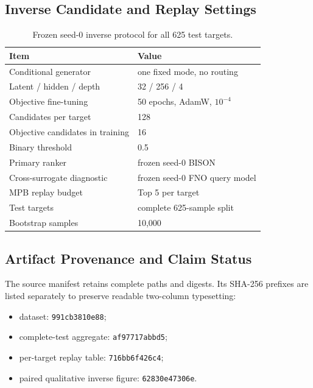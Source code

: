 \subsection{Inverse Candidate and Replay Settings}

\begin{table}[H]
  \caption{Frozen seed-0 inverse protocol for all 625 test targets.}
  \label{tab:inverse-config}
  \centering
  \small
  \begin{tabular}{ll}
    \toprule
    Item & Value \\
    \midrule
    Conditional generator & one fixed mode, no routing \\
    Latent / hidden / depth & 32 / 256 / 4 \\
    Objective fine-tuning & 50 epochs, AdamW, $10^{-4}$ \\
    Candidates per target & 128 \\
    Objective candidates in training & 16 \\
    Binary threshold & 0.5 \\
    Primary ranker & frozen seed-0 BISON \\
    Cross-surrogate diagnostic & frozen seed-0 FNO query model \\
    MPB replay budget & Top 5 per target \\
    Test targets & complete 625-sample split \\
    Bootstrap samples & 10,000 \\
    \bottomrule
  \end{tabular}
\end{table}

\subsection{Artifact Provenance and Claim Status}
\label{app:provenance}

The source manifest retains complete paths and digests. Its SHA-256 prefixes
are listed separately to preserve readable two-column typesetting:
\begin{itemize}
  \item dataset: \texttt{991cb3810e88};
  \item complete-test aggregate: \texttt{af97717abbd5};
  \item per-target replay table: \texttt{716bb6f426c4};
  \item paired qualitative inverse figure: \texttt{62830e47306e}.
\end{itemize}

